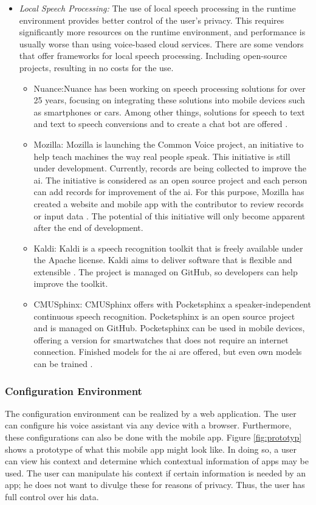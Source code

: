 \begin{itemize}
\begin{itemize}
	\end{itemize}
	\item \textsl{Local Speech Processing:} The use of local speech processing in the runtime environment provides better control of the user's privacy. This requires significantly more resources on the runtime environment, and performance is usually worse than using voice-based cloud services. There are some vendors that offer frameworks for local speech processing. Including open-source projects, resulting in no costs for the use.
	\begin{itemize}
		\item Nuance:Nuance has been working on speech processing solutions for over 25 years, focusing on integrating these solutions into mobile devices such as smartphones or cars. Among other things, solutions for speech to text and text to speech conversions and to create a chat bot are offered \cite{Nuance}. 
		\item Mozilla: Mozilla is launching the Common Voice project, an initiative to help teach machines the way real people speak. This initiative is still under development. Currently, records are being collected to improve the \ac{ai}. The initiative is considered as an open source project and each person can add records for improvement of the \ac{ai}. For this purpose, Mozilla has created a website and mobile app with the contributor to review records or input data \cite{MozillaCommonVoice}. The potential of this initiative will only become apparent after the end of development.
		\item Kaldi: Kaldi is a speech recognition toolkit that is freely available under the Apache license. Kaldi aims to deliver software that is flexible and extensible \cite{Kaldi}. The project is managed on GitHub, so developers can help improve the toolkit.
		\item CMUSphinx: CMUSphinx offers with Pocketsphinx a speaker-independent continuous speech recognition. Pocketsphinx is an open source project and is managed on GitHub. Pocketsphinx can be used in mobile devices, offering a version for smartwatches that does not require an internet connection. Finished models for the \ac{ai} are offered, but even own models can be trained \cite{Pocketsphinx}.
	\end{itemize}
\end{itemize}

\subsubsection{Configuration Environment}
The configuration environment can be realized by a web application. The user can configure his voice assistant via any device with a browser. Furthermore, these configurations can also be done with the mobile app. Figure \ref{fig:prototyp} shows a prototype of what this mobile app might look like. In doing so, a user can view his context and determine which contextual information of apps may be used. The user can manipulate his context if certain information is needed by an app; he does not want to divulge these for reasons of privacy. Thus, the user has full control over his data.

